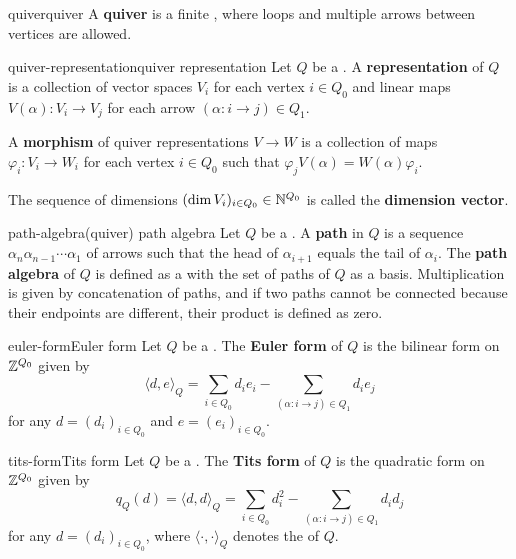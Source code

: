 \begin{topic}{quiver}{quiver}
    A \textbf{quiver} is a finite , where loops and multiple arrows between vertices are allowed.
\end{topic}

\begin{topic}{quiver-representation}{quiver representation}
    Let $Q$ be a . A \textbf{representation} of $Q$ is a collection of vector spaces $V_i$ for each vertex $i \in Q_0$ and linear maps $V(\alpha) \colon V_i \to V_j$ for each arrow $(\alpha \colon i \to j) \in Q_1$.
    
    A \textbf{morphism} of quiver representations $V \to W$ is a collection of maps $\varphi_i \colon V_i \to W_i$ for each vertex $i \in Q_0$ such that $\varphi_j V(\alpha) = W(\alpha) \varphi_i$.
    
    The sequence of dimensions $(\dim V_i)_{i \in Q_0} \in \mathbb{N}^{Q_0}$ is called the \textbf{dimension vector}.
\end{topic}

\begin{topic}{path-algebra}{(quiver) path algebra}
    Let $Q$ be a . A \textbf{path} in $Q$ is a sequence $\alpha_n \alpha_{n - 1} \cdots \alpha_1$ of arrows such that the head of $\alpha_{i + 1}$ equals the tail of $\alpha_{i}$. The \textbf{path algebra} of $Q$ is defined as a  with the set of paths of $Q$ as a basis. Multiplication is given by concatenation of paths, and if two paths cannot be connected because their endpoints are different, their product is defined as zero.
\end{topic}

\begin{topic}{euler-form}{Euler form}
    Let $Q$ be a . The \textbf{Euler form} of $Q$ is the bilinear form on $\mathbb{Z}^{Q_0}$ given by
    \[ \langle d, e \rangle_Q = \sum_{i \in Q_0} d_i e_i - \sum_{(\alpha \colon i \to j) \in Q_1} d_i e_j \]
    for any $d = (d_i)_{i \in Q_0}$ and $e = (e_i)_{i \in Q_0}$.
\end{topic}

\begin{topic}{tits-form}{Tits form}
    Let $Q$ be a . The \textbf{Tits form} of $Q$ is the quadratic form on $\mathbb{Z}^{Q_0}$ given by
    \[ q_Q(d) = \langle d, d \rangle_Q = \sum_{i \in Q_0} d_i^2 - \sum_{(\alpha \colon i \to j) \in Q_1} d_i d_j \]
    for any $d = (d_i)_{i \in Q_0}$, where $\langle \cdot, \cdot \rangle_Q$ denotes the  of $Q$.
\end{topic}
